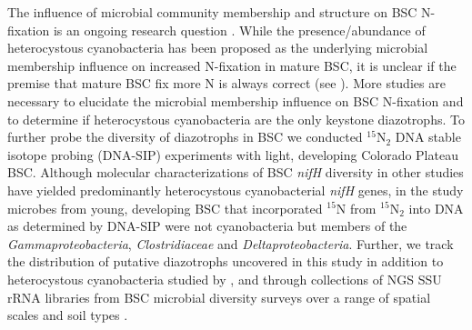 The influence of microbial community membership and structure on BSC N-fixation
is an ongoing research question \citep{Belnap28062013}. While the
presence/abundance of heterocystous cyanobacteria has been proposed as the
underlying microbial membership influence on increased N-fixation in mature
BSC, it is unclear if the premise that mature BSC fix more N is always correct
(see \citet{15643930}). More studies are necessary to elucidate the microbial
membership influence on BSC N-fixation and to determine if heterocystous
cyanobacteria are the only keystone diazotrophs. To further probe the diversity
of diazotrophs in BSC we conducted $^{15}$N$_{2}$ DNA stable isotope probing
(DNA-SIP) experiments with light, developing Colorado Plateau BSC. Although
molecular characterizations of BSC \textit{nifH} diversity in other studies
have yielded predominantly heterocystous cyanobacterial \textit{nifH} genes, in
the study microbes from young, developing BSC that incorporated $^{15}$N from
$^{15}$N$_{2}$ into DNA as determined by DNA-SIP were not cyanobacteria but
members of the \textit{Gammaproteobacteria}, \textit{Clostridiaceae} and
\textit{Deltaproteobacteria}. Further, we track the distribution of putative
diazotrophs uncovered in this study in addition to heterocystous
cyanobacteria studied by \citet{14766579}, \citet{Yeager} and
\citet{Yeager_2012} through collections of NGS SSU rRNA libraries from BSC
microbial diversity surveys over a range of spatial scales and soil types
\citep{Garcia_Pichel_2013, Steven_2013}.
